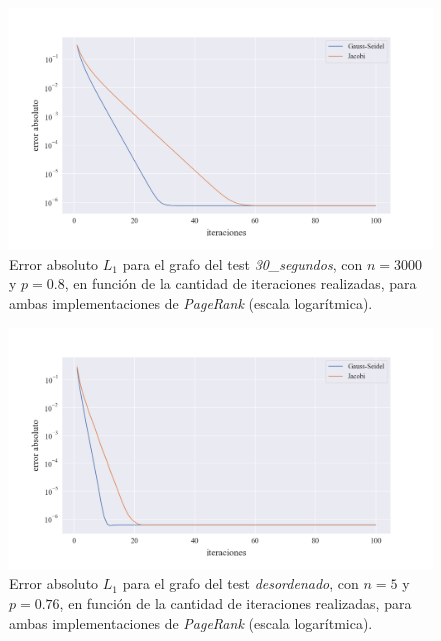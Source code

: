 \vspace{1em}
\newpage
\begin{figure}[!htbp]
    \centering
    \includegraphics[width=.9\textwidth]{files/src/.media/convergencia_test_30_segundos.png}
    \caption{Error absoluto $L_1$ para el grafo del test \textit{30\_segundos}, con $n = 3000$ y $p = 0.8$, en función de la cantidad de iteraciones realizadas, para ambas implementaciones de \textit{PageRank} (escala logarítmica).} \label{test_30_segundos}
\end{figure}

\vspace{1em}
\begin{figure}[!htbp]
    \centering
    \includegraphics[width=.9\textwidth]{files/src/.media/convergencia_test_aleatorio_desordenado.png}
    \caption{Error absoluto $L_1$ para el grafo del test \textit{desordenado}, con $n = 5$ y $p = 0.76$, en función de la cantidad de iteraciones realizadas, para ambas implementaciones de \textit{PageRank} (escala logarítmica).} \label{test_aleatorio_desordenado}
\end{figure}

